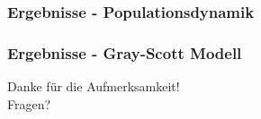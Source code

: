 \documentclass[aspectratio=32]{beamer}
\newcommand{\sectionframe}{\begin{frame}
	\begin{center}
		\textcolor{simtechred}{\Large\insertsection}
	\end{center}
\end{frame}}
\begin{document}
\begin{frame}
\frametitle{Ergebnisse - Populationsdynamik}

\end{frame}

\begin{frame}
\frametitle{Ergebnisse - Gray-Scott Modell}

\end{frame}

%
%


\begin{frame}
\begin{center}
\Large
\textcolor{simtechred}{Danke für die Aufmerksamkeit! \\ Fragen?}
\end{center}
\end{frame}
\end{document}
